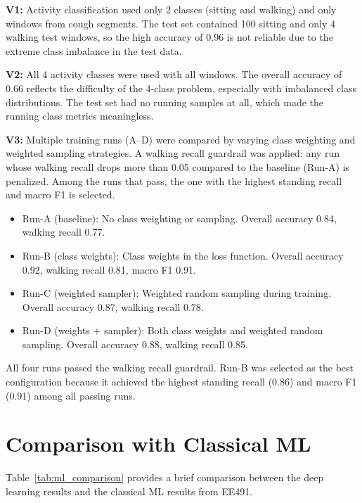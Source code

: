 \textbf{V1:} Activity classification used only 2 classes (sitting and walking) and only windows from cough segments. The test set contained 100 sitting and only 4 walking test windows, so the high accuracy of 0.96 is not reliable due to the extreme class imbalance in the test data.

\textbf{V2:} All 4 activity classes were used with all windows. The overall accuracy of 0.66 reflects the difficulty of the 4-class problem, especially with imbalanced class distributions. The test set had no running samples at all, which made the running class metrics meaningless.

\textbf{V3:} Multiple training runs (A--D) were compared by varying class weighting and weighted sampling strategies. A walking recall guardrail was applied: any run whose walking recall drops more than 0.05 compared to the baseline (Run-A) is penalized. Among the runs that pass, the one with the highest standing recall and macro F1 is selected.

\begin{itemize}[nosep]
    \item Run-A (baseline): No class weighting or sampling. Overall accuracy 0.84, walking recall 0.77.
    \item Run-B (class weights): Class weights in the loss function. Overall accuracy 0.92, walking recall 0.81, macro F1 0.91.
    \item Run-C (weighted sampler): Weighted random sampling during training. Overall accuracy 0.87, walking recall 0.78.
    \item Run-D (weights + sampler): Both class weights and weighted random sampling. Overall accuracy 0.88, walking recall 0.85.
\end{itemize}

All four runs passed the walking recall guardrail. Run-B was selected as the best configuration because it achieved the highest standing recall (0.86) and macro F1 (0.91) among all passing runs.

\section{Comparison with Classical ML}

Table~\ref{tab:ml_comparison} provides a brief comparison between the deep learning results and the classical ML results from EE491.

